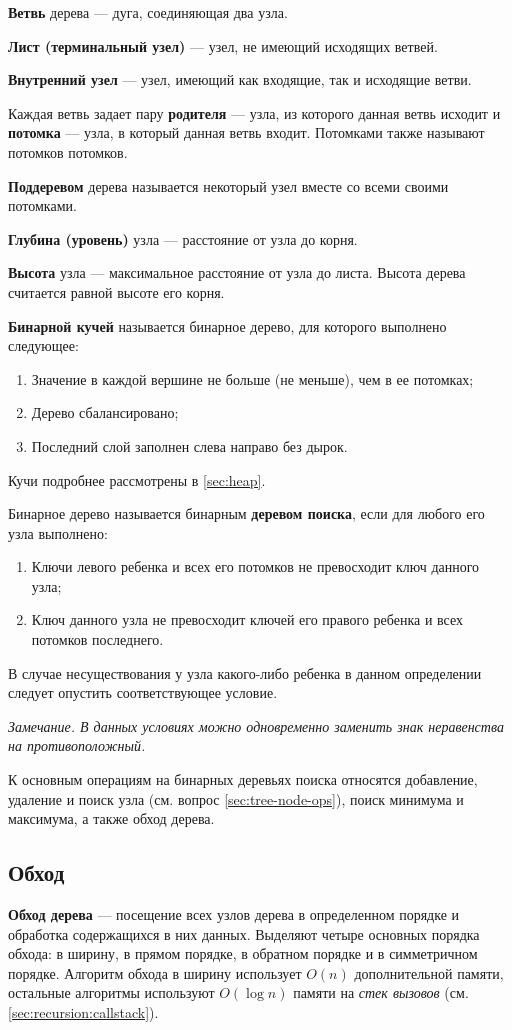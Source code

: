 \textbf{Ветвь} дерева --- дуга, соединяющая два узла. 

\textbf{Лист (терминальный узел)} --- узел, не имеющий исходящих ветвей.

\textbf{Внутренний узел} --- узел, имеющий как входящие, так и исходящие ветви.

Каждая ветвь задает пару \textbf{родителя} --- узла, из которого данная ветвь исходит
и \textbf{потомка} --- узла, в который данная ветвь входит. Потомками также называют
потомков потомков.

\textbf{Поддеревом} дерева называется некоторый узел вместе со всеми своими потомками.

\textbf{Глубина (уровень)} узла --- расстояние от узла до корня.

\textbf{Высота} узла --- максимальное расстояние от узла до листа. Высота дерева считается
равной высоте его корня.

\textbf{Бинарной кучей} называется бинарное дерево, для которого выполнено следующее:
\begin{enumerate}
  \item Значение в каждой вершине не больше (не меньше), чем в ее потомках;
  \item Дерево сбалансировано;
  \item Последний слой заполнен слева направо без дырок.
\end{enumerate}
Кучи подробнее рассмотрены в \ref{sec:heap}.

\label{def:bst}
Бинарное дерево называется бинарным \textbf{деревом поиска}, если для любого его узла выполнено:
\begin{enumerate}
  \item Ключи левого ребенка и всех его потомков не превосходит ключ данного узла;
  \item Ключ данного узла не превосходит ключей его правого ребенка и всех потомков последнего.
\end{enumerate}
В случае несуществования у узла какого-либо ребенка в данном определении следует опустить соответствующее условие.

{\small\itshape Замечание. В данных условиях можно одновременно заменить знак неравенства на противоположный.}

К основным операциям на бинарных деревьях поиска относятся добавление, удаление и поиск узла (см. вопрос \ref{sec:tree-node-ops}),
поиск минимума и максимума, а также обход дерева.

\subsection{Обход}
\textbf{Обход дерева} --- посещение всех узлов дерева в определенном порядке и обработка содержащихся в них данных.
Выделяют четыре основных порядка обхода: в ширину, в прямом порядке, в обратном порядке и в симметричном порядке.
Алгоритм обхода в ширину использует $O(n)$ дополнительной памяти, остальные алгоритмы используют $O(\log n)$ памяти
на \textit{стек вызовов} (см. \ref{sec:recursion:callstack}).

